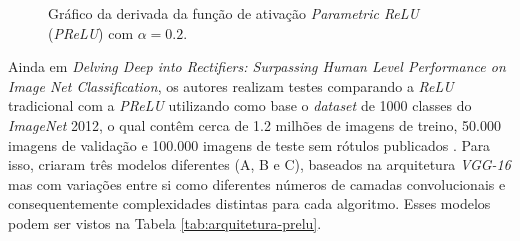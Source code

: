 \begin{figure}[h!]
    \centering
    \caption{Gráfico da derivada da função de ativação \textit{Parametric ReLU} (\textit{PReLU}) com $\alpha=0.2$.}
    \label{fig:prelu-derivada}
\end{figure}

Ainda em \textit{Delving Deep into Rectifiers: Surpassing Human Level Performance on Image Net Classification}, os autores realizam testes comparando a \textit{ReLU} tradicional com a \textit{PReLU} utilizando como base o \textit{dataset} de 1000 classes do \textit{ImageNet} 2012, o qual contêm cerca de 1.2 milhões de imagens de treino, 50.000 imagens de validação e 100.000 imagens de teste sem rótulos publicados \parencite{PReLUArticle}. Para isso, \textcite{PReLUArticle} criaram três modelos diferentes (A, B e C), baseados na arquitetura \textit{VGG-16} mas com variações entre si como diferentes números de camadas convolucionais e consequentemente complexidades distintas para cada algoritmo. Esses modelos podem ser vistos na Tabela \ref{tab:arquitetura-prelu}. 

